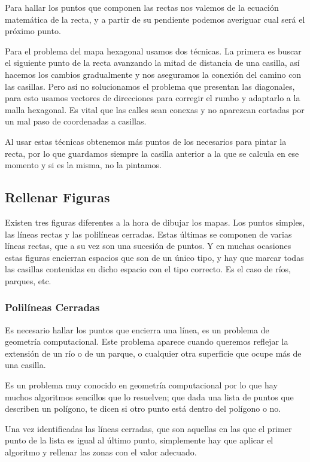 Para hallar los puntos que componen las rectas nos valemos de la ecuación
matemática de la recta, y a partir de su pendiente podemos averiguar cual será
el próximo punto.

Para el problema del mapa hexagonal usamos dos técnicas. La primera es buscar el
siguiente punto de la recta avanzando la mitad de distancia de una casilla, así
hacemos los cambios gradualmente y nos aseguramos la conexión del camino con
las casillas. Pero así no solucionamos el problema que presentan las diagonales,
para esto usamos vectores de direcciones para corregir el rumbo y adaptarlo a la
malla hexagonal. Es vital que las calles sean conexas y no aparezcan cortadas
por un mal paso de coordenadas a casillas.

Al usar estas técnicas obtenemos más puntos de los necesarios para pintar la
recta, por lo que guardamos siempre la casilla anterior a la que se calcula en
ese momento y si es la misma, no la pintamos.

\subsection{Rellenar Figuras}

Existen tres figuras diferentes a la hora de dibujar los mapas. Los puntos
simples, las líneas rectas y las polilíneas cerradas. Estas últimas se componen
de varias líneas rectas, que a su vez son una sucesión de puntos. Y en muchas
ocasiones estas figuras encierran espacios que son de un único tipo, y hay que
marcar todas las casillas contenidas en dicho espacio con el tipo correcto. Es
el caso de ríos, parques, etc.

\subsubsection{Polilíneas Cerradas}

Es necesario hallar los puntos que encierra una línea, es un problema de
geometría computacional. Este problema aparece cuando queremos reflejar la
extensión de un río o de un parque, o cualquier otra superficie que ocupe más de
una casilla.

Es un problema muy conocido en geometría computacional por lo que hay muchos
algoritmos sencillos que lo resuelven; que dada una lista de puntos que
describen un polígono, te dicen si otro punto está dentro del polígono o no.

Una vez identificadas las líneas cerradas, que son aquellas en las que el primer
punto de la lista es igual al último punto, simplemente hay que aplicar el
algoritmo y rellenar las zonas con el valor adecuado.

